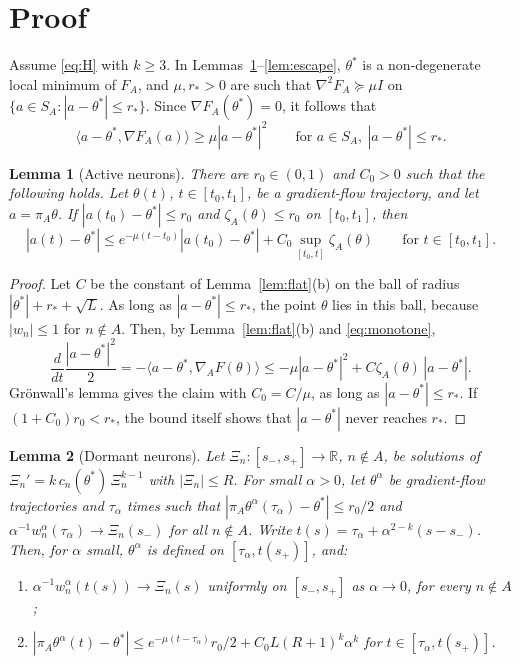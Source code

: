 \documentclass[11pt]{article}
\newtheorem{lemma}{Lemma}
\theoremstyle{definition}
\theoremstyle{remark}
\newcommand{\R}{\mathbb{R}}
\newcommand{\ip}[2]{\langle #1,#2\rangle}
\begin{document}
\section{Proof}

Assume \eqref{eq:H} with $k\ge3$. In Lemmas~\ref{lem:active}--\ref{lem:escape}, $\theta^*$ is a non-degenerate local minimum of $F_A$, and $\mu,r_*>0$ are such that $\nabla^2F_A\succeq\mu I$ on $\{a\in S_A:|a-\theta^*|\le r_*\}$. Since $\nabla F_A(\theta^*)=0$, it follows that
\begin{equation}\label{eq:monotone}
\ip{a-\theta^*}{\nabla F_A(a)}\ge\mu|a-\theta^*|^2\qquad\text{for }a\in S_A,\ |a-\theta^*|\le r_* .
\end{equation}

\begin{lemma}[Active neurons]\label{lem:active}
There are $r_0\in(0,1)$ and $C_0>0$ such that the following holds. Let $\theta(t)$, $t\in[t_0,t_1]$, be a gradient-flow trajectory, and let $a=\pi_A\theta$. If $|a(t_0)-\theta^*|\le r_0$ and $\zeta_A(\theta)\le r_0$ on $[t_0,t_1]$, then
\[
|a(t)-\theta^*|\le e^{-\mu(t-t_0)}|a(t_0)-\theta^*|+C_0\sup_{[t_0,t]}\zeta_A(\theta)\qquad\text{for }t\in[t_0,t_1].
\]
\end{lemma}

\begin{proof}
Let $C$ be the constant of Lemma~\ref{lem:flat}(b) on the ball of radius $|\theta^*|+r_*+\sqrt L$. As long as $|a-\theta^*|\le r_*$, the point $\theta$ lies in this ball, because $|w_n|\le1$ for $n\notin A$. Then, by Lemma~\ref{lem:flat}(b) and \eqref{eq:monotone},
\[
\frac{d}{dt}\frac{|a-\theta^*|^2}2=-\ip{a-\theta^*}{\nabla_AF(\theta)}\le-\mu|a-\theta^*|^2+C\zeta_A(\theta)\,|a-\theta^*| .
\]
Grönwall's lemma gives the claim with $C_0=C/\mu$, as long as $|a-\theta^*|\le r_*$. If $(1+C_0)r_0<r_*$, the bound itself shows that $|a-\theta^*|$ never reaches $r_*$.
\end{proof}

\begin{lemma}[Dormant neurons]\label{lem:dormant}
Let $\Xi_n\colon[s_-,s_+]\to\R$, $n\notin A$, be solutions of $\Xi_n'=k\,c_n(\theta^*)\,\Xi_n^{k-1}$ with $|\Xi_n|\le R$. For small $\alpha>0$, let $\theta^\alpha$ be gradient-flow trajectories and $\tau_\alpha$ times such that $|\pi_A\theta^\alpha(\tau_\alpha)-\theta^*|\le r_0/2$ and $\alpha^{-1}w^\alpha_n(\tau_\alpha)\to\Xi_n(s_-)$ for all $n\notin A$. Write $t(s)=\tau_\alpha+\alpha^{2-k}(s-s_-)$. Then, for $\alpha$ small, $\theta^\alpha$ is defined on $[\tau_\alpha,t(s_+)]$, and:
\begin{enumerate}[label=\textup{(\alph*)},nosep]
\item $\alpha^{-1}w^\alpha_n(t(s))\to\Xi_n(s)$ uniformly on $[s_-,s_+]$ as $\alpha\to0$, for every $n\notin A$;
\item $|\pi_A\theta^\alpha(t)-\theta^*|\le e^{-\mu(t-\tau_\alpha)}r_0/2+C_0L(R+1)^k\alpha^k$ for $t\in[\tau_\alpha,t(s_+)]$.
\end{enumerate}
\end{lemma}
\end{document}
